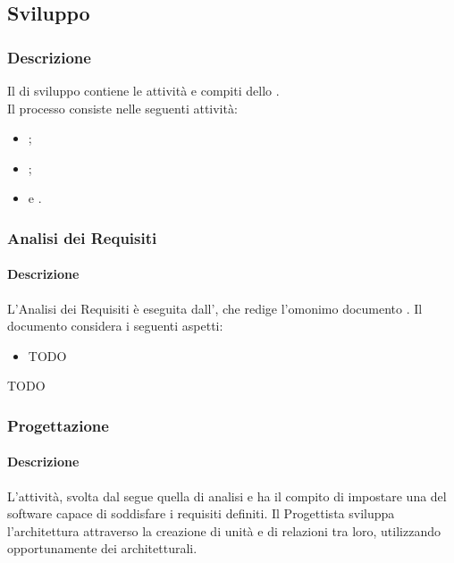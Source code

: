 \subsection{Sviluppo}\label{sviluppo}

\subsubsection{Descrizione}
Il  di sviluppo contiene le attività e compiti dello .\\
Il processo consiste nelle seguenti attività:
\begin{itemize}
  \item {};
  \item {};
  \item {} e .
\end{itemize}


\subsubsection{Analisi dei Requisiti}
\paragraph{Descrizione}
L'Analisi dei Requisiti è eseguita dall', che redige l'omonimo documento \AnalisiDeiRequisiti. Il documento considera i seguenti aspetti:
\begin{itemize}
  \item TODO %
\end{itemize}

TODO %

\subsubsection{Progettazione}
\paragraph{Descrizione}
L'attività, svolta dal  segue quella di analisi e ha il compito di impostare una  del software capace di soddisfare i requisiti definiti. Il Progettista sviluppa l'architettura attraverso la creazione di unità e di relazioni tra loro, utilizzando opportunamente dei  architetturali.\\

